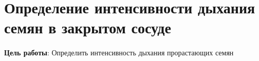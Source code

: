 \section*{\lbtitle Определение интенсивности дыхания семян в закрытом сосуде}








\paragraph*{}\textbf{Цель работы}: Определить интенсивность дыхания прорастающих семян

